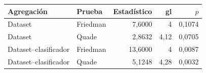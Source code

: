 \begin{resulttable}
\centering\fontsize{8.5}{10.5}\selectfont\setlength{\tabcolsep}{4pt}
\caption{Contrastes globales de macro-F1 bajo las dos formas de agregación.}
\label{tab:global-tests-comparison}
\begin{tabular}{@{}llrrr@{}}
\toprule
Agregación & Prueba & Estadístico & gl & $p$ \\
\midrule
Dataset & Friedman & 7,6000 & 4 & 0,1074 \\
Dataset & Quade & 2,8632 & 4,12 & 0,0705 \\
Dataset--clasificador & Friedman & 13,6000 & 4 & 0,0087 \\
Dataset--clasificador & Quade & 5,1248 & 4,28 & 0,0032 \\
\bottomrule
\end{tabular}
\par{}
\end{resulttable}
\FloatBarrier
